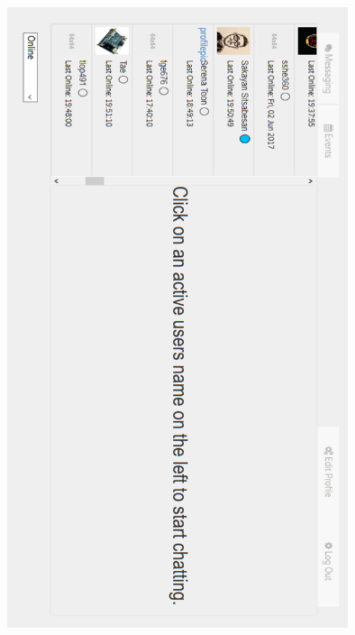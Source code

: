 \documentclass[a4paper,10pt,twoside]{article}
\begin{document}
\begin{center}
\includegraphics[width=0.75\textwidth]{appendix4.png}


\end{center}
\end{document}
